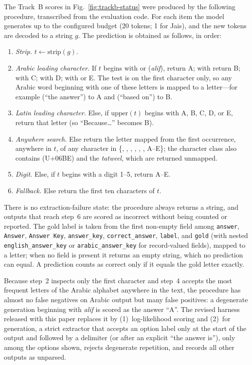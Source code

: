 The Track~B scores in Fig.~\ref{fig:trackb-status} were produced by the following
procedure, transcribed from the evaluation code. For each item the model generates up
to the configured budget (20 tokens; 1 for Jais), and the new tokens are decoded to a
string $g$. The prediction is obtained as follows, in order:
\begin{enumerate}
  \item \emph{Strip.} $t \leftarrow \mathrm{strip}(g)$.
  \item \emph{Arabic leading character.} If $t$ begins with  or 
        (\emph{alif}), return A; with  return B; with  C; with  D;
        with  or  E. The test is on the first character only, so any Arabic
        word beginning with one of these letters is mapped to a letter---for example
         (``the answer'') to A and  (``based on'') to B.
  \item \emph{Latin leading character.} Else, if $\mathrm{upper}(t)$ begins with A, B,
        C, D, or E, return that letter (so ``Because\ldots'' becomes B).
  \item \emph{Anywhere search.} Else return the letter mapped from the first occurrence,
        anywhere in $t$, of any character in \{, , , , ,
        , A--E\}; the character class also contains  (U+06BE) and the
        \emph{tatweel}, which are returned unmapped.
  \item \emph{Digit.} Else, if $t$ begins with a digit 1--5, return A--E.
  \item \emph{Fallback.} Else return the first ten characters of $t$.
\end{enumerate}
There is no extraction-failure state: the procedure always returns a string, and
outputs that reach step~6 are scored as incorrect without being counted or reported.
The gold label is taken from the first non-empty field among \texttt{answer},
\texttt{Answer}, \texttt{Answer Key}, \texttt{answer\_key}, \texttt{correct\_answer},
\texttt{label}, and \texttt{gold} (with nested \texttt{english\_answer\_key}
or \texttt{arabic\_answer\_key} for record-valued fields), mapped to a letter; when no
field is present it returns an empty string, which no prediction can equal. A prediction
counts as correct only if it equals the gold letter exactly.

Because step~2 inspects only the first character and step~4 accepts the most frequent
letters of the Arabic alphabet anywhere in the text, the procedure has almost no false
negatives on Arabic output but many false positives: a degenerate generation beginning
with \emph{alif} is scored as the answer ``A''. The revised harness released with this
paper replaces it by (1)~log-likelihood scoring and (2)~for generation, a strict
extractor that accepts an option label only at the start of the output and followed by
a delimiter (or after an explicit ``the answer is''), only among the options shown,
rejects degenerate repetition, and records all other outputs as unparsed.

